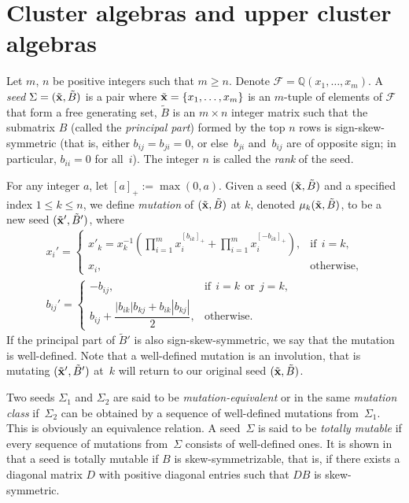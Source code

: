 \section{Cluster algebras and upper cluster algebras}\label{section2}

Let $m$, $n$ be positive integers such that $m\geq n$. Denote $\mathcal{F}=\mathbb{Q}(x_1,\dots,x_m)$.
A \emph{seed}  $\Sigma=(\tilde{\bf x},\tilde{B})$ is a pair where $\tilde{\bf x}=\{x_1,\ldots,x_m\}$ is an $m$-tuple of elements of $\mathcal{F}$ that form a free generating set, $\tilde{B}$ is an $m\times n$ integer matrix such that the submatrix $B$  (called the \emph{principal part}) formed by the top $n$ rows is sign-skew-symmetric (that is, either $b_{ij}=b_{ji}=0$, or else~$b_{ji}$ and~$b_{ij} $ are of opposite sign; in particular, $b_{ii}=0$ for all~$i$).
The integer $n$ is called the \emph{rank} of the seed.

For any integer $a$, let $[a]_+:= \max(0,a)$.
 Given a seed $(\tilde{\bf x},\tilde{B})$ and a specif\/ied index $1\leq k \leq n$, we def\/ine \emph{mutation} of $(\tilde{\bf x},\tilde{B})$ at $k$, denoted $\mu_{k}(\tilde{\bf x},\tilde{B})$, to be a new seed $(\tilde{\bf x}',\tilde{B}')$, where
\begin{gather*}
 x_i' = \begin{cases}
\displaystyle  x'_k=x_k^{-1}\left(\prod\limits_{i=1}^{m}x_i^{[b_{ik}]_+}+\prod\limits_{i=1}^{m}x_i^{[-b_{ik}]_+}\right),
  & \mbox{if} \ \  i=k, \\
x_i, & \mbox{otherwise}, \end{cases}\\
b_{ij}' = \begin{cases} -b_{ij}, & \mbox{if} \ \ i=k \ \ \text{or} \ \ j=k,  \\
b_{ij} + \dfrac{|b_{ik}|b_{kj} + b_{ik}|b_{kj}|}{2}, & \mbox{otherwise.}
\end{cases}
\end{gather*}
If the principal part of $\tilde{B}'$ is also sign-skew-symmetric, we say that the mutation is well-def\/ined.
Note that a well-def\/ined mutation is an involution, that is mutating $(\tilde{\bf x}', \tilde{B}')$ at~$k$ will return to our original seed $(\tilde{\bf x}, \tilde{B})$.

Two seeds $\Sigma_1$ and $\Sigma_2$ are said to be \emph{mutation-equivalent} or in the same \emph{mutation class} if~$\Sigma_2$ can be obtained by a sequence of well-def\/ined mutations from~$\Sigma_1$. This is obviously an equivalence relation. A seed~$\Sigma$ is said to be \emph{totally mutable}  if every sequence of mutations from~$\Sigma$ consists of well-def\/ined ones. It is shown in \cite[Proposition~4.5]{FZ1} that a seed is totally mutable if $B$ is skew-symmetrizable, that is, if there exists a diagonal matrix $D$ with positive diagonal entries such that $DB$ is skew-symmetric.


